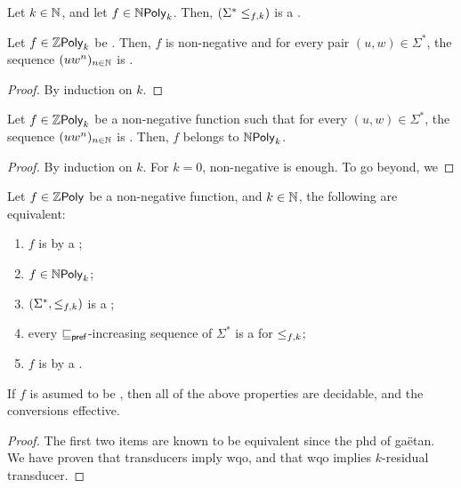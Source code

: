 \begin{lemma}
    \label{n-poly-k-implies-wqo:lemma}
    Let $k \in \mathbb{N}$, and let $f \in \NPoly[k]$.
    Then, $(\Sigma^* \mathrel{\leq_{{f},{k}}})$ is a .
\end{lemma}


\begin{conjecture}
    Let $f \in \ZPoly[k]$
    be .
    Then, $f$ is non-negative and for every pair
    $(u,w) \in \Sigma^*$,
    the sequence $(u w^n)_{n \in \mathbb{N}}$
    is .
\end{conjecture}
\begin{proof}
    By induction on $k$.
\end{proof}

\begin{conjecture}
    Let $f \in \ZPoly[k]$
    be a non-negative function such that for every
    $(u,w) \in \Sigma^*$,
    the sequence $(u w^n)_{n \in \mathbb{N}}$
    is .
    Then, $f$ belongs to $\NPoly[k]$.
\end{conjecture}
\begin{proof}
    By induction on $k$.
    For $k = 0$, non-negative is enough.
    To go beyond, we

\end{proof}

\begin{theorem}
    \label{non-commutative-npoly:thm}
    Let $f \in \ZPoly$ be a non-negative function, 
    and $k \in \mathbb{N}$,
    the following are equivalent:
    \begin{enumerate}
        \item $f$ is 
            by a ;
        \item $f \in \NPoly[k]$;
        \item $(\Sigma^*, \mathrel{\leq_{{f},{k}}})$ is a
            ;
        \item every $\sqsubseteq_{\mathsf{pref}}$-increasing sequence
            of $\Sigma^*$  is a 
            for $\mathrel{\leq_{{f},{k}}}$;
        \item $f$ is  by a
            .
    \end{enumerate}
    If $f$ is asumed to be , then all of the above
    properties are decidable, and the conversions effective.
\end{theorem}
\begin{proof}
    The first two items are known to be equivalent since 
    the phd of gaëtan.
    We have proven that transducers imply
    wqo, and that wqo implies $k$-residual transducer.
\end{proof}

